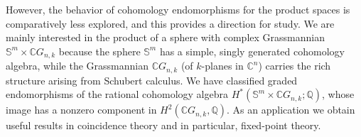 \documentclass{amsart}
\begin{document}
    However, the behavior of cohomology endomorphisms for the product spaces is comparatively less explored, and this provides a direction for study.
    We are mainly interested in the product of a sphere
	with complex Grassmannian $\mathbb S^m\times \mathbb CG_{n,k}$ because the sphere $\mathbb{S}^m$ has a %
simple, singly generated %
cohomology algebra, while the Grassmannian $\mathbb{C}G_{n,k}$ (of $k$-planes in $\mathbb C^n$)
	carries the rich structure arising from Schubert calculus. We have classified graded endomorphisms of the rational cohomology algebra $H^*(\mathbb{S}^m \times \mathbb{C}G_{n,k};\mathbb{Q})$, whose image has a nonzero component in $H^2(\mathbb CG_{n,k},\mathbb Q)$.  As an application we obtain useful results in coincidence %
theory and in %
particular, fixed-point theory.  
	
\end{document}
